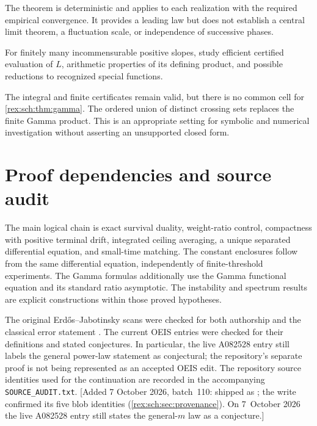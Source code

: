The theorem is deterministic and applies to each realization with
the required empirical convergence. It provides a leading law but
does not establish a central limit theorem, a fluctuation scale,
or independence of successive phases.

\begin{question}\label{rex:sch:q:symbolic}
For finitely many incommensurable positive slopes, study efficient
certified evaluation of $L$, arithmetic properties of its defining
product, and possible reductions to recognized special functions.
\end{question}

The integral and finite certificates remain valid, but there is no
common cell for \cref{rex:sch:thm:gamma}. The ordered union of distinct
crossing sets replaces the finite Gamma product. This is an
appropriate setting for symbolic and numerical investigation
without asserting an unsupported closed form.

\section{Proof dependencies and source audit}
\label{rex:sch:sec:audit}

The main logical chain is exact survival duality, weight-ratio
control, compactness with positive terminal drift, integrated
ceiling averaging, a unique separated differential equation, and
small-time matching. The constant enclosures follow from the
same differential equation, independently of finite-threshold
experiments. The Gamma formulas additionally use the Gamma
functional equation and its standard ratio asymptotic. The
instability and spectrum results are explicit constructions
within those proved hypotheses.

The original Erd\H{o}s--Jabotinsky scans were checked for both
authorship and the classical error statement \cite{erdos-jabotinsky}.
The current OEIS entries were checked for their definitions and
stated conjectures. In particular, the live A082528 entry still
labels the general power-law statement as conjectural; the
repository's separate proof is not being represented as an
accepted OEIS edit. The repository source identities used for
the continuation are recorded in the accompanying
\texttt{SOURCE\_AUDIT.txt}.
[Added 7 October 2026, batch~110: shipped as
; the write confirmed its five blob
identities (\cref{rex:sch:sec:provenance}). On 7~October 2026 the live
A082528 entry still states the general-$m$ law as a conjecture.]

